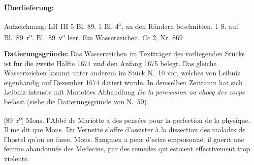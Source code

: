 \begin{ledgroupsized}[r]{120mm}%
\footnotesize%
\pstart%
\noindent%
\textbf{\"{U}berlieferung:}%
\pend%
\end{ledgroupsized}%
\begin{ledgroupsized}[r]{114mm}%
\footnotesize%
\pstart%
\parindent -6mm%
%
Aufzeichnung:
LH III 5 Bl. 89.
1 Bl. 4\textsuperscript{o}, an den Rändern beschnitten.
1 S. auf Bl.~89~r\textsuperscript{o}.
Bl.~89~v\textsuperscript{o} leer.
Ein Wasserzeichen.%
\newline%
Cc 2, Nr. 869%
\pend%
\end{ledgroupsized}%
%
\vspace*{5mm}%
\begin{ledgroup}%
\footnotesize%
\pstart%
\noindent%
\footnotesize{%
\textbf{Datierungsgr\"{u}nde:}
Das Wasserzeichen im Textträger des vorliegenden Stücks ist für die zweite Hälfte 1674 und den Anfang 1675 belegt.
Das gleiche Wasserzeichen kommt unter anderem im Stück N.~10 %
vor, welches von Leibniz eigenhändig auf Dezember 1674 datiert wurde.
In demselben Zeitraum hat sich Leibniz intensiv mit Mariottes Abhandlung \cite{00311}\textit{De la percussion ou chocq des corps} befasst
(siehe die Datierungsgründe von N.~50).%
}%
\pend%
\end{ledgroup}%
%
%
\vspace*{8mm}%
\count{}
\count{}
\count{}
\pstart%
\normalsize%
\noindent%
[89~r\textsuperscript{o}] Mons. l'Abb\'{e} de Mariotte\protect{} a des pens\'{e}es  pour la perfection de la physique. Il me dit que Mons. Du Vernette\protect{} s'offre d'assister \`{a} la dissection des malades de l'hostel  qu'on en fasse. 
\pend%
\pstart%
Mons. Sanguien\protect{} a peur d'estre empoisonn\'{e}, il guerit une femme abandonn\'{e}e des Medecins, par des remedes qui estoient effectivement trop violents.
\pend%
\pstart%
